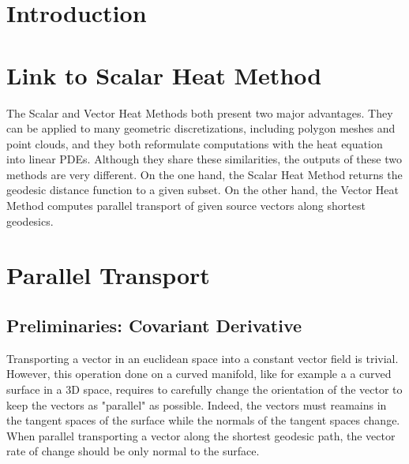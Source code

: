 \documentclass[sigconf]{acmart}
\begin{document}



\maketitle

\section{Introduction}

\section{Link to Scalar Heat Method}
The Scalar and Vector Heat Methods both present two major advantages. 
They can be applied to many geometric discretizations, including polygon meshes and point clouds, and they both reformulate computations with the heat equation into linear PDEs. Although they share these similarities, the outputs of these two methods are very different. On the one hand, the Scalar Heat Method returns the geodesic distance function to a given subset. On the other hand, the Vector Heat Method computes parallel transport of given source vectors along shortest geodesics. 


\section{Parallel Transport}

\subsection{Preliminaries: Covariant Derivative}
Transporting a vector in an euclidean space into a constant vector field is trivial. However, this operation done on a curved manifold, like for example a a curved surface in a 3D space, requires to carefully change the orientation of the vector to keep the vectors as "parallel" as possible. Indeed, the vectors must reamains in the tangent spaces of the surface while the normals of the tangent spaces change. When parallel transporting a vector along the shortest geodesic path, the vector rate of change should be only normal to the surface. 
\end{document}
